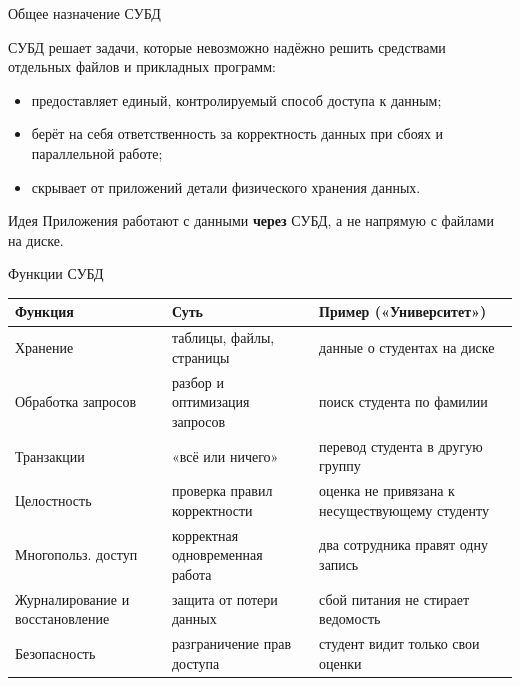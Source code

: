 \documentclass[aspectratio=169]{beamer}
\begin{document}
\begin{frame}{Общее назначение СУБД}

СУБД решает задачи, которые невозможно надёжно решить
средствами отдельных файлов и прикладных программ:

\vspace{0.3cm}

\begin{itemize}
  \item предоставляет единый, контролируемый способ
        доступа к данным;
  \item берёт на себя ответственность за корректность
        данных при сбоях и параллельной работе;
  \item скрывает от приложений детали физического
        хранения данных.
\end{itemize}

\vspace{0.3cm}

\begin{block}{Идея}
Приложения работают с данными \textbf{через} СУБД,
а не напрямую с файлами на диске.
\end{block}

\end{frame}


\begin{frame}{Функции СУБД}

\scriptsize
\begin{table}
\centering
\begin{tabular}{p{}|p{}|p{}}
\toprule
\textbf{Функция} & \textbf{Суть} & \textbf{Пример («Университет»)}\\
\midrule
Хранение & таблицы, файлы, страницы & данные о студентах на диске\\
Обработка запросов & разбор и оптимизация запросов & поиск студента по фамилии\\
Транзакции & «всё или ничего» & перевод студента в другую группу\\
Целостность & проверка правил корректности & оценка не привязана к несуществующему студенту\\
Многопольз. доступ & корректная одновременная работа & два сотрудника правят одну запись\\
Журналирование и восстановление & защита от потери данных & сбой питания не стирает ведомость\\
Безопасность & разграничение прав доступа & студент видит только свои оценки\\
\bottomrule
\end{tabular}
\end{table}

\end{frame}
\end{document}
